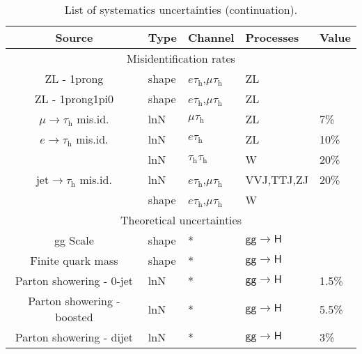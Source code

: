 \begin{table}[!]
    \centering
    \caption{List of systematics uncertainties (continuation).}\label{SU:sys_uncs_2}
    \begin{tabular}{cllll}
        \toprule
        Source                                  & Type                  & Channel                       & Processes & Value \\ \hline
        \multicolumn{5}{c}{Misidentification rates} \\ \midrule
        ZL - 1prong                       & shape                   & $e\tau_\text{h}$,$\mu\tau_\text{h}$ & ZL &   \\
        ZL - 1prong1pi0                   & shape                   & $e\tau_\text{h}$,$\mu\tau_\text{h}$ & ZL &   \\
        $\mu\rightarrow\tau_\text{h}$ mis.id.    & lnN                     & $\mu\tau_\text{h}$           & ZL & 7\% \\  
        $e\rightarrow\tau_\text{h}$ mis.id.      & lnN                     & $e\tau_\text{h}$             & ZL & 10\% \\  
        \multirow{3}{*}{$\text{jet}\rightarrow \tau_\text{h}$ mis.id.} & lnN & $\tau_\text{h}\tau_\text{h}$ & W  & 20\% \\
                                         & lnN  & $e\tau_\text{h}$,$\mu\tau_\text{h}$ & VVJ,TTJ,ZJ & 20\%  \\          
                                         & shape & $e\tau_\text{h}$,$\mu\tau_\text{h}$ & W &               \\  \midrule  
        \multicolumn{5}{c}{Theoretical uncertainties} \\ \midrule
        gg Scale                                & shape                 & *                             & $\mathsf{gg\rightarrow H}$      &           \\ 
        Finite quark mass                       & shape                 & *                             & $\mathsf{gg\rightarrow H}$       &           \\ 
        Parton showering - 0-jet                & lnN                   & *                             & $\mathsf{gg\rightarrow H}$      & 1.5\%           \\ 
        Parton showering - boosted              & lnN                   & *                             & $\mathsf{gg\rightarrow H}$       & 5.5\%           \\ 
        Parton showering - dijet                & lnN                   & *                             & $\mathsf{gg\rightarrow H}$       & 3\%           \\ 

\end{tabular}
\end{table}
